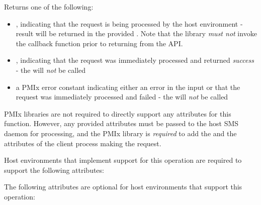 \begin{arglist}
\end{arglist}

Returns one of the following:

\begin{itemize}
    \item {}, indicating that the request is being processed by the host environment - result will be returned in the provided . Note that the library \emph{must not} invoke the callback function prior to returning from the \ac{API}.
    \item {}, indicating that the request was immediately processed and returned \textit{success} - the  will \textit{not} be called
    \item a PMIx error constant indicating either an error in the input or that the request was immediately processed and failed - the  will \textit{not} be called
\end{itemize}

\reqattrstart
\ac{PMIx} libraries are not required to directly support any attributes for this function. However, any provided attributes must be passed to the host \ac{SMS} daemon for processing, and the \ac{PMIx} library is \textit{required} to add the  and the  attributes of the client process making the request.

\divider

Host environments that implement support for this operation are required to support the following attributes:


\reqattrend

\optattrstart
The following attributes are optional for host environments that support this operation:


